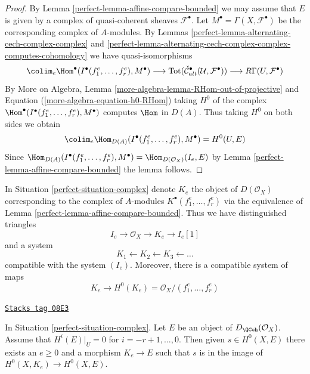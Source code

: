 \begin{proof}

By Lemma \ref{perfect-lemma-affine-compare-bounded} we may assume that $E$
is given by a complex of quasi-coherent sheaves $\mathcal{F}^\bullet$.
Let $M^\bullet = \Gamma(X, \mathcal{F}^\bullet)$ be the corresponding
complex of $A$-modules. By
Lemmas \ref{perfect-lemma-alternating-cech-complex-complex} and
\ref{perfect-lemma-alternating-cech-complex-complex-computes-cohomology}
we have quasi-isomorphisms
$$
\colim_e \Hom^\bullet(I^\bullet(f_1^e, \ldots, f_r^e), M^\bullet)
\longrightarrow
\text{Tot}(\check{\mathcal{C}}_{alt}^\bullet(\mathcal{U}, \mathcal{F}^\bullet))
\longrightarrow
R\Gamma(U, \mathcal{F}^\bullet)
$$
By More on Algebra, Lemma \ref{more-algebra-lemma-RHom-out-of-projective} and
Equation (\ref{more-algebra-equation-h0-RHom})
taking $H^0$ of the complex
$\Hom^\bullet(I^\bullet(f_1^e, \ldots, f_r^e), M^\bullet)$
computes $\Hom$ in $D(A)$. Thus taking $H^0$ on both sides we obtain
$$
\colim_e \Hom_{D(A)}(I^\bullet(f_1^e, \ldots, f_r^e), M^\bullet)
=
H^0(U, E)
$$
Since $\Hom_{D(A)}(I^\bullet(f_1^e, \ldots, f_r^e), M^\bullet) =
\Hom_{D(\mathcal{O}_X)}(I_e, E)$ by
Lemma \ref{perfect-lemma-affine-compare-bounded} the lemma follows.
\end{proof}

In Situation \ref{perfect-situation-complex} denote $K_e$ the object of
$D(\mathcal{O}_X)$ corresponding to the complex of $A$-modules
$K^\bullet(f_1^e, \ldots, f_r^e)$ via the equivalence of
Lemma \ref{perfect-lemma-affine-compare-bounded}. Thus we have distinguished
triangles
$$
I_e \to \mathcal{O}_X \to K_e \to I_e[1]
$$
and a system
$$
K_1 \leftarrow
K_2 \leftarrow
K_3 \leftarrow \ldots
$$
compatible with the system $(I_e)$.
Moreover, there is a compatible system of maps
$$
K_e \to H^0(K_e) = \mathcal{O}_X/(f_1^e, \ldots, f_r^e)
$$

\begin{lemma}
\label{perfect-lemma-represent-cohomology-class-on-closed}
\href{https://stacks.math.columbia.edu/tag/08E3}{\texttt{Stacks tag 08E3}}

In Situation \ref{perfect-situation-complex}. Let $E$ be an object of
$D_\QCoh(\mathcal{O}_X)$.
Assume that $H^i(E)|_U = 0$ for $i = - r + 1, \ldots, 0$.
Then given $s \in H^0(X, E)$ there exists an $e \geq 0$ and
a morphism $K_e \to E$ such that $s$ is in the image of
$H^0(X, K_e) \to H^0(X, E)$.
\end{lemma}

